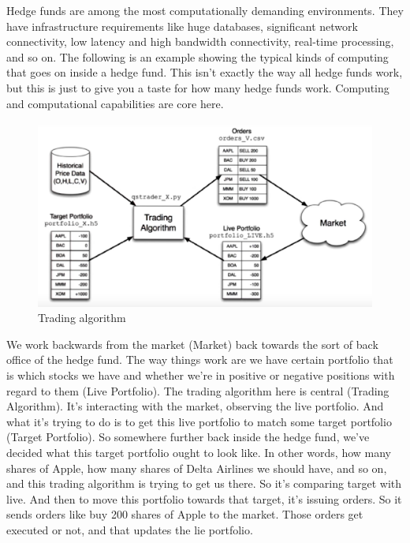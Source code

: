 \documentclass[12pt]{article}
\begin{document}
\noindent
Hedge funds are among the most computationally demanding environments. They have infrastructure requirements like huge databases, significant network connectivity, low latency and high bandwidth connectivity, real-time processing, and so on. The following is an example showing the typical kinds of computing that goes on inside a hedge fund. This isn't exactly the way all hedge funds work, but this is just to give you a taste for how many hedge funds work. Computing and computational capabilities are core here. \\[8pt]
\begin{figure}[!ht]
\centering
\includegraphics[scale=0.35]{fig/fig24}
\caption{Trading algorithm}
\end{figure}
\noindent
We work backwards from the market (Market) back towards the sort of back office of the hedge fund. The way things work are we have certain portfolio that is which stocks we have and whether we're in positive or negative positions with regard to them (Live Portfolio). The trading algorithm here is central (Trading Algorithm). It's interacting with the market, observing the live portfolio. And what it's trying to do is to get this live portfolio to match some target portfolio (Target Portfolio). So somewhere further back inside the hedge fund, we've decided what this target portfolio ought to look like. In other words, how many shares of Apple, how many shares of Delta Airlines we should have, and so on, and this trading algorithm is trying to get us there. So it's comparing target with live. And then to move this portfolio towards that target, it's issuing orders. So it sends orders like buy 200 shares of Apple to the market. Those orders get executed or not, and that updates the lie portfolio. 
\end{document}
